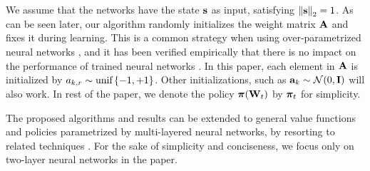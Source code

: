 
We assume that the networks have the state ${\mathbf{s}}$ as input, satisfying $\left\| {\mathbf{s}} \right\|_2 = 1$.
As can be seen later, our algorithm randomly initializes the weight matrix ${\mathbf{A}}$ and fixes it during learning. 
This is a common strategy when using over-parametrized neural networks \citep{li2018learning,du2018gradientA,du2018gradientB,allen2018convergenceA,allen2018convergenceB}, and it has been verified empirically that there is no impact on the performance of trained neural networks \citep{hoffer2018fix}.
In this paper, each element in ${\mathbf{A}}$ is initialized by $a_{k,r} \sim {\text{unif}}\left\{-1, +1\right\}$. Other initializations, such as ${\mathbf{a}}_k \sim {\mathcal{N}}(0, {\mathbf{I}})$ will also work. In rest of the paper, we denote the policy ${\boldsymbol{\pi}}({\mathbf{W}}_t)$ by ${\boldsymbol{\pi}}_t$ for simplicity.

The proposed algorithms and results can be extended to general value functions and policies parametrized by multi-layered neural networks, by resorting to related techniques \citep{allen2018convergenceA,allen2018convergenceB,du2018gradientA}. For the sake of simplicity and conciseness, we focus only on two-layer neural networks in the paper.


